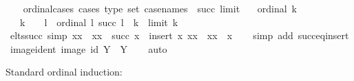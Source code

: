 \begin{isabellebody}
%
\isadelimproof
\ \ %
\endisadelimproof
%
\isatagproof
{}\isamarkupfalse%
%
\endisatagproof
{\isafoldproof}%
%
\isadelimproof
\isanewline
%
\endisadelimproof
\isanewline
{}\isamarkupfalse%
\ ordinal{\isacharunderscore}{\kern0pt}cases\ {\isacharbrackleft}{\kern0pt}cases\ type{\isacharcolon}{\kern0pt}\ set{\isacharcomma}{\kern0pt}\ case{\isacharunderscore}{\kern0pt}names\ {}\ succ\ limit{\isacharbrackright}{\kern0pt}{\isacharcolon}{\kern0pt}\isanewline
\ \ \ {\isachardoublequoteopen}ordinal\ k{\isachardoublequoteclose}\isanewline
\ \ \ {\isachardoublequoteopen}k\ {\isacharequal}{\kern0pt}\ {}{\isachardoublequoteclose}\ {\isacharbar}{\kern0pt}\ l\ \ {\isachardoublequoteopen}ordinal\ l{\isachardoublequoteclose}\ {\isachardoublequoteopen}succ\ l\ {\isacharequal}{\kern0pt}\ k{\isachardoublequoteclose}\ {\isacharbar}{\kern0pt}\ {\isachardoublequoteopen}limit\ k{\isachardoublequoteclose}\isanewline
%
\isadelimproof
\ \ %
\endisadelimproof
%
\isatagproof
{}\isamarkupfalse%
%
\endisatagproof
{\isafoldproof}%
%
\isadelimproof
\isanewline
%
\endisadelimproof
\isanewline
{}\isamarkupfalse%
\ elts{\isacharunderscore}{\kern0pt}succ\ {\isacharbrackleft}{\kern0pt}simp{\isacharbrackright}{\kern0pt}{\isacharcolon}{\kern0pt}\ {\isachardoublequoteopen}{\isacharbraceleft}{\kern0pt}xx\ {\isacharbar}{\kern0pt}\ xx\ {\isasymin}\ {\isacharparenleft}{\kern0pt}succ\ x{\isacharparenright}{\kern0pt}{\isacharbraceright}{\kern0pt}\ {\isacharequal}{\kern0pt}\ insert\ x\ {\isacharbraceleft}{\kern0pt}xx\ {\isacharbar}{\kern0pt}\ xx\ {\isasymin}\ x{\isacharbraceright}{\kern0pt}{\isachardoublequoteclose}\isanewline
%
\isadelimproof
\ \ %
\endisadelimproof
%
\isatagproof
{}\isamarkupfalse%
\ {\isacharparenleft}{\kern0pt}simp\ add{\isacharcolon}{\kern0pt}\ succ{\isacharunderscore}{\kern0pt}eq{\isacharunderscore}{\kern0pt}insert{\isacharparenright}{\kern0pt}%
\endisatagproof
{\isafoldproof}%
%
\isadelimproof
\isanewline
%
\endisadelimproof
\isanewline
{}\isamarkupfalse%
\ image{\isacharunderscore}{\kern0pt}ident{\isacharcolon}{\kern0pt}\ {\isachardoublequoteopen}image\ id\ Y\ {\isacharequal}{\kern0pt}\ Y{\isachardoublequoteclose}\isanewline
%
\isadelimproof
\ \ %
\endisadelimproof
%
\isatagproof
{}\isamarkupfalse%
\ auto%
\endisatagproof
{\isafoldproof}%
%
\isadelimproof
%
\endisadelimproof
%
\begin{isamarkuptext}%
Standard ordinal induction:%
\end{isamarkuptext}\isamarkuptrue%

\end{isabellebody}
